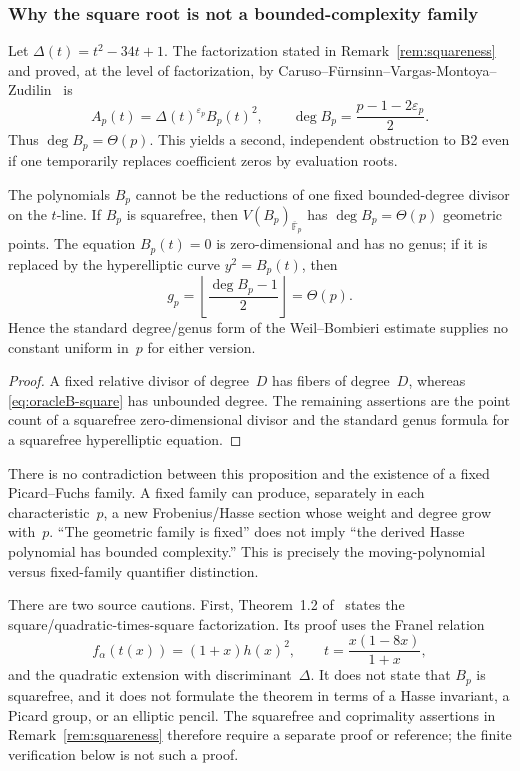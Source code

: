 \subsubsection{Why the square root is not a bounded-complexity family}

Let $\Delta(t)=t^2-34t+1$.  The factorization stated in
Remark~\ref{rem:squareness} and proved, at the level of factorization, by
Caruso--F\"urnsinn--Vargas-Montoya--Zudilin~\cite{CFVZ2026} is
\begin{equation}
 A_p(t)=\Delta(t)^{\varepsilon_p}B_p(t)^2,
 \qquad
 \deg B_p=\frac{p-1-2\varepsilon_p}{2}.
 \label{eq:oracleB-square}
\end{equation}
Thus $\deg B_p=\Theta(p)$.  This yields a second, independent obstruction
to B2 even if one temporarily replaces coefficient zeros by evaluation
roots.

\begin{proposition}
\label{prop:oracleB-complexity}
The polynomials $B_p$ cannot be the reductions of one fixed bounded-degree
divisor on the $t$-line.  If $B_p$ is squarefree, then
$V(B_p)_{\overline{\mathbb F}_p}$ has $\deg B_p=\Theta(p)$ geometric
points.  The equation $B_p(t)=0$ is zero-dimensional and has no genus;
if it is replaced by the hyperelliptic curve $y^2=B_p(t)$, then
\[
 g_p=\left\lfloor\frac{\deg B_p-1}{2}\right\rfloor=\Theta(p).
\]
Hence the standard degree/genus form of the Weil--Bombieri estimate supplies
no constant uniform in~$p$ for either version.
\end{proposition}

\begin{proof}
A fixed relative divisor of degree~$D$ has fibers of degree~$D$, whereas
\eqref{eq:oracleB-square} has unbounded degree.  The remaining assertions
are the point count of a squarefree zero-dimensional divisor and the
standard genus formula for a squarefree hyperelliptic equation.
\end{proof}

There is no contradiction between this proposition and the existence of a
fixed Picard--Fuchs family.  A fixed family can produce, separately in each
characteristic~$p$, a new Frobenius/Hasse section whose weight and degree
grow with~$p$.  ``The geometric family is fixed'' does not imply ``the
derived Hasse polynomial has bounded complexity.''  This is precisely the
moving-polynomial versus fixed-family quantifier distinction.

There are two source cautions.  First, Theorem~1.2 of~\cite{CFVZ2026}
states the square/quadratic-times-square factorization.  Its proof uses the
Franel relation
\begin{equation}
 f_\alpha(t(x))=(1+x)h(x)^2,
 \qquad t=\frac{x(1-8x)}{1+x},
 \label{eq:oracleB-franel-cover}
\end{equation}
and the quadratic extension with discriminant~$\Delta$.  It does not state
that $B_p$ is squarefree, and it does not formulate the theorem in terms of
a Hasse invariant, a Picard group, or an elliptic pencil.  The squarefree
and coprimality assertions in Remark~\ref{rem:squareness} therefore require
a separate proof or reference; the finite verification below is not such a
proof.

